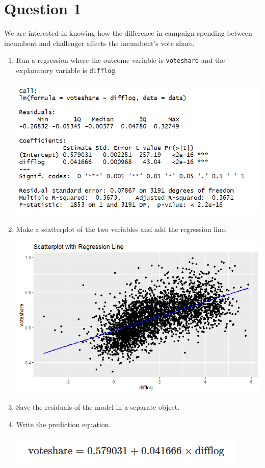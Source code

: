 \documentclass[12pt,letterpaper]{article}
\begin{document}
\section*{Question 1}
\vspace{.25cm}
\noindent We are interested in knowing how the difference in campaign spending between incumbent and challenger affects the incumbent's vote share. 
	\begin{enumerate}
		\item Run a regression where the outcome variable is \texttt{voteshare} and the explanatory variable is \texttt{difflog}.
        	  
	        \includegraphics[width=0.8\linewidth]{Q1}
		\item Make a scatterplot of the two variables and add the regression line. 
			 
			\includegraphics[width=0.9\linewidth]{Q2}
		\item Save the residuals of the model in a separate object.
			 
		\item Write the prediction equation.
		     
		    \includegraphics[width=0.8\linewidth]{Q4}
	\end{enumerate}
	
\end{document}

